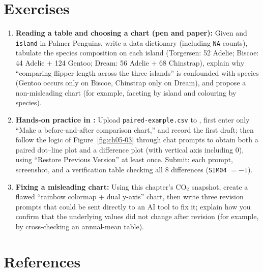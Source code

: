 \section{Exercises}

\begin{enumerate}
\item \textbf{Reading a table and choosing a chart (pen and paper):} Given  and \texttt{island} in Palmer Penguins, write a data dictionary (including \texttt{NA} counts), tabulate the species composition on each island (Torgersen: 52 Adelie; Biscoe: 44 Adelie $+$ 124 Gentoo; Dream: 56 Adelie $+$ 68 Chinstrap), explain why ``comparing flipper length across the three islands'' is confounded with species (Gentoo occurs only on Biscoe, Chinstrap only on Dream), and propose a non-misleading chart (for example, faceting by island and colouring by species).
\item \textbf{Hands-on practice in \scidraw{}:} Upload \texttt{paired-example.csv} to , first enter only ``Make a before-and-after comparison chart,'' and record the first draft; then follow the logic of Figure~\ref{fig:ch05-03} through chat prompts to obtain both a paired dot--line plot and a difference plot (with vertical axis including $0$), using ``Restore Previous Version'' at least once. Submit: each prompt, screenshot, and a verification table checking all 8 differences (\texttt{SIM04} $= -1$).
\item \textbf{Fixing a misleading chart:} Using this chapter's $\text{CO}_2$ snapshot, create a flawed ``rainbow colormap + dual y-axis'' chart, then write three revision prompts that could be sent directly to an AI tool to fix it; explain how you confirm that the underlying values did not change after revision (for example, by cross-checking an annual-mean table).
\end{enumerate}

\section*{References}


